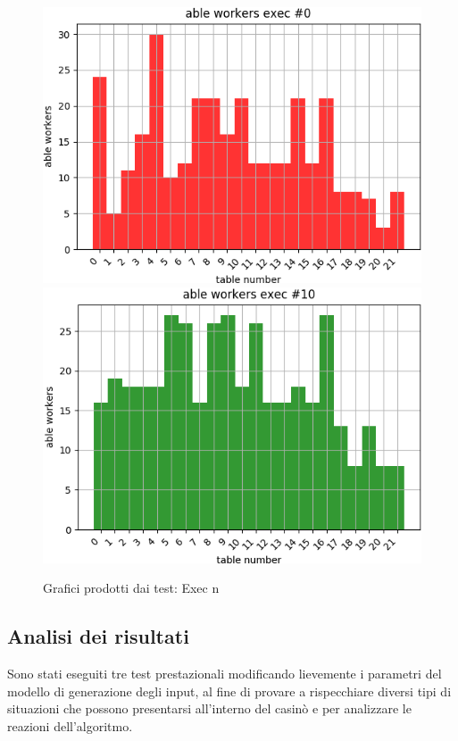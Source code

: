     \begin{figure}[!h]
        \label{fig611}
        \begin{widepage}
            \centering
            \includegraphics[width=.49\textwidth]{../immagini/exec_0.png}\hfil
            \includegraphics[width=.49\textwidth]{../immagini/exec_1.png}
            \caption{Grafici prodotti dai test: Exec n}
        \end{widepage}
    \end{figure}
    \FloatBarrier
    \noindent
   
   \subsection{Analisi dei risultati}
   Sono stati eseguiti tre test prestazionali modificando lievemente i parametri del modello di generazione degli input, al fine di provare a rispecchiare diversi tipi di situazioni che possono presentarsi all'interno del casinò e per analizzare le reazioni dell'algoritmo.
